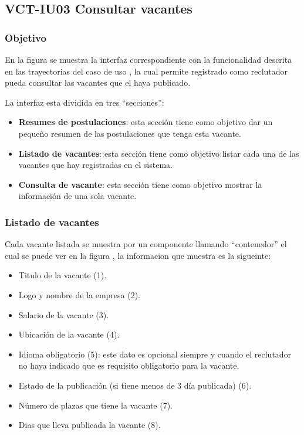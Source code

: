 \clearpage
\subsection{VCT-IU03 Consultar vacantes}

\subsubsection{Objetivo}
En la figura  se muestra la interfaz correspondiente con la funcionalidad descrita en las
trayectorias del caso de uso  , la cual permite registrado como reclutador pueda consultar las vacantes que el haya publicado.


La interfaz  esta dividida en tres ``secciones'':
\begin{itemize}
    \item \textbf{Resumes de postulaciones}: esta sección tiene como objetivo dar un pequeño resumen de las postulaciones que tenga esta vacante.
   \item \textbf{Listado de vacantes}: esta sección tiene como objetivo listar cada una de las vacantes que hay registradas en el sistema.
   \item \textbf{Consulta de vacante}: esta sección tiene como objetivo mostrar la información de una sola vacante.
\end{itemize}

\subsubsection{Listado de vacantes}
Cada vacante listada se muestra por un componente llamando ``contenedor'' el cual se puede ver en la figura , la informacion que 
muestra es la sigueinte: 
\begin{itemize}
   \item Titulo de la vacante (1).
   \item Logo y nombre de la empresa (2).
   \item Salario de la vacante (3).
   \item Ubicación de la vacante (4).
   \item Idioma obligatorio (5): este dato es opcional siempre y cuando el reclutador no haya indicado que es requisito obligatorio 
   para la vacante.
   \item Estado de la publicación (si tiene menos de 3 día publicada) (6).
   \item Número de plazas que tiene la vacante (7).
   \item Dias que lleva publicada la vacante (8).
\end{itemize}

